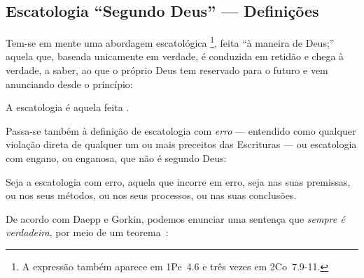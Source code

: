 

    \subsection{Escatologia ``Segundo Deus'' --- Definições}

    Tem-se em mente uma abordagem escatológica  \footnote{A  expressão  
    também aparece em 1Pe~4.6 e três vezes em 2Co~7.9-11.}, feita ``à maneira de  Deus;''  aquela  que,  baseada  unicamente  em
    verdade, é conduzida em retidão e chega à verdade, a saber, ao que o  próprio  Deus  tem  reservado  para  o  futuro  e  vem
    anunciando desde o princípio:

    \begin{DEF}
        \label{def.esc.segDeus}
        A escatologia    é  aquela  feita  .
    \end{DEF}

    Passa-se também à definição de escatologia com \emph{erro} --- entendido como qualquer violação direta de qualquer um ou mais
    preceitos das Escrituras --- ou escatologia com engano, ou enganosa, que não é segundo Deus:

    \begin{DEF}
        \label{def.esc.comerro}
        Seja a escatologia com erro, aquela que incorre em erro, seja nas suas premissas, ou nos  seus  métodos,  ou
        nos seus processos, ou nas suas conclusões.
    \end{DEF}

    De acordo com Daepp e Gorkin, podemos enunciar uma sentença que \emph{sempre é verdadeira}, por meio de um
    teorema~\cite[p.~17]{2011-DaeppU+GorkinP-Springer}:

